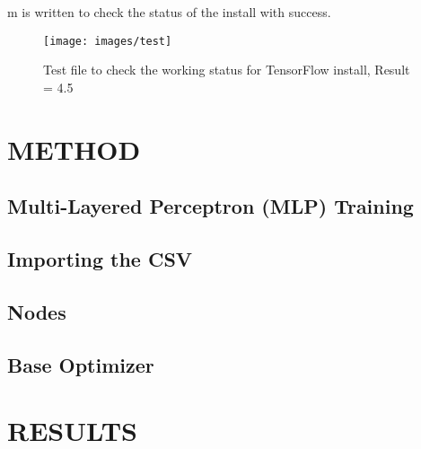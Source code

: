 \documentclass[a4paper, 10pt]{IEEEconf}
\begin{document}
m is written to check the status of the install with success.

\begin{figure}[H]
  \texttt{[image: images/test]}
  \caption{Test file to check the working status for TensorFlow install, Result = 4.5}
  \label{fig:Test file to check the working status for TensorFlow install, Result = 4.5}
\end{figure}

\section{METHOD}
 


\subsection{Multi-Layered Perceptron (MLP) Training}

\subsection{Importing the CSV}

\subsection{Nodes}


\subsection{Base Optimizer}



\section{RESULTS}
\end{document}
